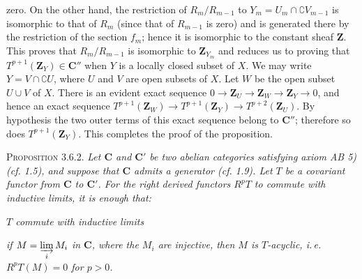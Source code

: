 
\noindent zero. On the other hand, the restriction of $R_m/R_{m-1}$ to
$Y_m=U_m\cap \complement V_{m-1}$ is isomorphic to that of $R_m$ (since that
of $R_{m-1}$ is zero) and is generated there by the restriction of the section
$f_m$; hence it is isomorphic to the constant sheaf $\mathbf Z$.
This proves that $R_m/R_{m-1}$ is isomorphic to $\mathbf Z_{Y_m}$ and reduces us to
proving that $T^{p+1}(\mathbf Z_Y)\in \mathbf C''$ when $Y$ is a locally closed subset of
$X$. We may write $Y=V\cap \complement U$, where $U$ and $V$ are open subsets
of $X$. Let $W$ be the open subset $U\cup V$ of $X$. There is an evident exact
sequence
$0\to \mathbf Z_U\to \mathbf Z_W\to \mathbf Z_Y\to0$,
and hence an exact sequence
$T^{p+1}(\mathbf Z_W)\to T^{p+1}(\mathbf Z_Y)\to T^{p+2}(\mathbf Z_U)$.
By hypothesis the two outer terms of this exact sequence belong to $\mathbf C''$;
therefore so does $T^{p+1}(\mathbf Z_Y)$. This completes the proof of the proposition.

\indent\textsc{Proposition 3.6.2.} \textit{Let $\mathbf C$ and $\mathbf C'$ be two
abelian categories satisfying axiom \textup{AB 5) (}cf. \textup{1.5)}, and suppose that $\mathbf C$
admits a generator \textup{(}cf. \textup{1.9)}. Let $T$ be a covariant functor from $\mathbf C$ to $\mathbf C'$.
For the right derived functors $R^pT$ to commute with inductive limits, it is
enough that:}
\begin{description}
\item[\textnormal{\textit{a})}] \textit{$T$ commute with inductive limits}
\item[\textnormal{\textit{b})}] \textit{if $M=\varinjlim\limits_i M_i$ in $\mathbf C$, where the $M_i$
are injective, then $M$ is $T$-acyclic, i.\,e.
$R^pT(M)=0$ for $p>0$.}
\end{description}

